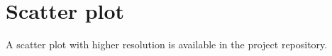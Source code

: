\documentclass[\main/main.tex]{subfiles}
\begin{document}
\section{Scatter plot}
A scatter plot with higher resolution is available in the project repository.
\begin{center}
\end{center}
\end{document}
